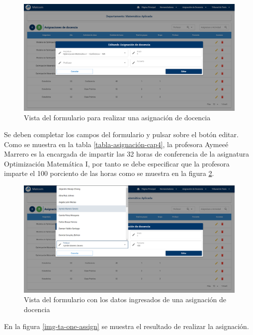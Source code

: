 \begin{figure}[H]
    \includegraphics[scale=0.3]{Graphics/Implementation/Docencia/AD-form-empty}
    \caption{Vista del formulario para realizar una asignación de docencia}
    \label{img-ta-form-empty}
\end{figure}


Se deben completar los campos del formulario y pulsar sobre el botón editar. 
Como se muestra en la tabla \ref{tabla-asignación-cap4}, la profesora Aymeeé Marrero es la encargada de 
impartir las 32 horas de conferencia de la asignatura Optimización Matemática I, por 
tanto se debe especificar que la profesora imparte el 100 porciento de las horas 
como se muestra en la figura \ref{img-ta-form-fill}.


\begin{figure}[H]
    \includegraphics[scale=0.3]{Graphics/Implementation/Docencia/AD-form-fill.png}
    \caption{Vista del formulario con los datos ingresados de una asignación de docencia}
    \label{img-ta-form-fill}
\end{figure}


En la figura \ref{img-ta-one-assign} se muestra el resultado 
de realizar la asignación.


